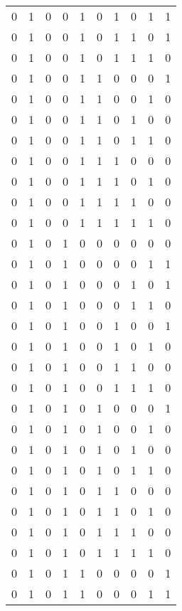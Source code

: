 \begin{longtable}[c]{rrrrrrrrrr}
        0 & 1 & 0 & 0 & 1 & 0 & 1 & 0 & 1 & 1 \\
        0 & 1 & 0 & 0 & 1 & 0 & 1 & 1 & 0 & 1 \\
        0 & 1 & 0 & 0 & 1 & 0 & 1 & 1 & 1 & 0 \\
        0 & 1 & 0 & 0 & 1 & 1 & 0 & 0 & 0 & 1 \\
        0 & 1 & 0 & 0 & 1 & 1 & 0 & 0 & 1 & 0 \\
        0 & 1 & 0 & 0 & 1 & 1 & 0 & 1 & 0 & 0 \\
        0 & 1 & 0 & 0 & 1 & 1 & 0 & 1 & 1 & 0 \\
        0 & 1 & 0 & 0 & 1 & 1 & 1 & 0 & 0 & 0 \\
        0 & 1 & 0 & 0 & 1 & 1 & 1 & 0 & 1 & 0 \\
        0 & 1 & 0 & 0 & 1 & 1 & 1 & 1 & 0 & 0 \\
        0 & 1 & 0 & 0 & 1 & 1 & 1 & 1 & 1 & 0 \\
        0 & 1 & 0 & 1 & 0 & 0 & 0 & 0 & 0 & 0 \\
        0 & 1 & 0 & 1 & 0 & 0 & 0 & 0 & 1 & 1 \\
        0 & 1 & 0 & 1 & 0 & 0 & 0 & 1 & 0 & 1 \\
        0 & 1 & 0 & 1 & 0 & 0 & 0 & 1 & 1 & 0 \\
        0 & 1 & 0 & 1 & 0 & 0 & 1 & 0 & 0 & 1 \\
        0 & 1 & 0 & 1 & 0 & 0 & 1 & 0 & 1 & 0 \\
        0 & 1 & 0 & 1 & 0 & 0 & 1 & 1 & 0 & 0 \\
        0 & 1 & 0 & 1 & 0 & 0 & 1 & 1 & 1 & 0 \\
        0 & 1 & 0 & 1 & 0 & 1 & 0 & 0 & 0 & 1 \\
        0 & 1 & 0 & 1 & 0 & 1 & 0 & 0 & 1 & 0 \\
        0 & 1 & 0 & 1 & 0 & 1 & 0 & 1 & 0 & 0 \\
        0 & 1 & 0 & 1 & 0 & 1 & 0 & 1 & 1 & 0 \\
        0 & 1 & 0 & 1 & 0 & 1 & 1 & 0 & 0 & 0 \\
        0 & 1 & 0 & 1 & 0 & 1 & 1 & 0 & 1 & 0 \\
        0 & 1 & 0 & 1 & 0 & 1 & 1 & 1 & 0 & 0 \\
        0 & 1 & 0 & 1 & 0 & 1 & 1 & 1 & 1 & 0 \\
        0 & 1 & 0 & 1 & 1 & 0 & 0 & 0 & 0 & 1 \\
        0 & 1 & 0 & 1 & 1 & 0 & 0 & 0 & 1 & 1 \\

\end{longtable}
